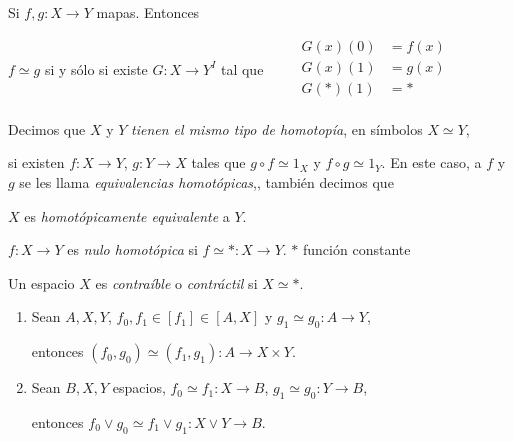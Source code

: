 \begin{tcolorbox}[colback=blue!5!white,colframe=blue!75!blue,title=\textbf{Proposición}.]
    Si \(f, g\colon X\to Y\) mapas. Entonces

    \(f\simeq g\) si y sólo si existe \(G\colon X\to Y^I\) tal que     
    \(\qquad 
    \begin{aligned}
        G(x)(0)&=f(x)\\[-3pt]
        G(x)(1)&=g(x)\\[-3pt]
        G(\ast)(1)&=\ast\\
    \end{aligned}\)
\end{tcolorbox}

\begin{tcolorbox}[colback=blue-violet!5!white,colframe=blue-violet!75!black,title=\textbf{Definición}.\index{tipo de homotopía}]
    Decimos que \(X\) y \(Y\) \textit{tienen el mismo tipo de homotopía}, en símbolos \(X\simeq Y\),
    
    si existen \(f\colon X\to Y\), \(g\colon Y\to X\) tales que \(g\circ f\simeq 1_{X}\) y \(f\circ g\simeq 1_{Y}\).
\tcblower
    En este caso, a \(f\) y \(g\) se les llama \textit{equivalencias homotópicas},, también decimos que 
    
    \(X\) es \textit{homotópicamente equivalente} a \(Y\).
\end{tcolorbox}


\begin{tcolorbox}[colback=blue-violet!5!white,colframe=blue-violet!75!black,title=\textbf{Definición}.\index{nulo homotopía}]
    \(f\colon X\to Y\) es \textit{nulo homotópica} si \(f\simeq\ast\colon X\to Y\).
\tcblower
\(\ast\) función constante
\end{tcolorbox}

\begin{tcolorbox}[colback=blue-violet!5!white,colframe=blue-violet!75!black,title=\textbf{Definición}.\index{espacio contraíble, espacio contráctil}]
    Un espacio \(X\) es \textit{contraíble} o \textit{contráctil} si \(X\simeq \ast\).
\end{tcolorbox}

\begin{tcolorbox}[colback=blue!5!white,colframe=blue!75!blue,title=\textbf{Lema}.]
    \begin{enumerate}[noitemsep, topsep=0pt]
        \item Sean \(A, X, Y\), \(f_0, f_1\in[f_1]\in[A, X]\) y \(g_1\simeq g_0\colon A\to Y\), 
        
        entonces \((f_0, g_0)\simeq (f_1, g_1)\colon A\to X\times Y\).
        \item Sean \(B, X, Y\) espacios, \(f_0\simeq f_1\colon X\to B\), \(g_1\simeq g_0\colon Y\to B\), 
        
        entonces \(f_0\vee g_0\simeq f_1\vee g_1\colon X\vee Y\to B\).
    \end{enumerate}
\end{tcolorbox}

